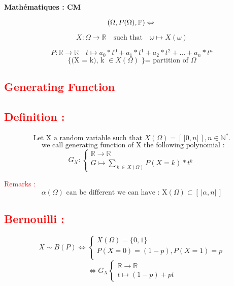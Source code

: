 \documentclass[a4paper,12pt]{article}
\begin{document}
\begin{center}
\textbf{Mathématiques : CM}
\end{center}

\[
(\Omega, P(\Omega), \mathbb{P}) \Leftrightarrow \\
\]

\bigskip
\begin{center}
\[
X : \Omega \rightarrow \mathbb{R}
\quad \text{such that} \quad
\omega \mapsto X(\omega)
\]
\bigskip

\[
P : \mathbb{R} \rightarrow \mathbb{R}
\quad t \mapsto a_0*t^0 + a_1 * t^1 + a_2 * t^2 +...+a_n * t^n
\]
\[
\text{\{(X = k), k } \in X(\Omega) \text{ \} = partition of }\Omega
\]

\end{center}


\begin{center}
\Large \textcolor{red}{\section*{Generating Function}}
\end{center}
\textcolor{red}{\subsection*{Definition :}} 
\[
\text{Let X a random variable such that } X(\Omega) = \left[\,|0, n|\,\right]
, n \in \mathbb{N}^*.
\]
\[
\text{ we call generating function of X the following polynomial :}
\]
\[
  G_X : \begin{cases}
    \mathbb{R} \rightarrow \mathbb{R}\\
 G \mapsto \sum_{ \, k \, \in \, X(\Omega)}{P(X = k) * t^k}
\end{cases}
\]

\textcolor{red}{Remarks :}\\

 \[\alpha(\Omega) \text{ can be different we can have : X}(\Omega) \subset \left[\,|\alpha, n|\,\right] \]
\bigskip

\textcolor{red}{\subsection*{Bernouilli :}}

\[
X \sim B(P) \Leftrightarrow
\begin{cases}
X (\Omega) = \{0,1\}\\
P(X= 0) = (1-p), P(X= 1) = p \\
\end{cases}
\]
\[
\Leftrightarrow G_X \begin{cases}
\mathbb{R} \rightarrow \mathbb{R}\\
t \mapsto (1-p) + pt
\end{cases}
\]
\end{document}
